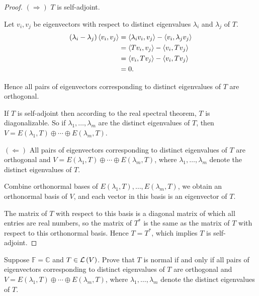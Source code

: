 \begin{proof}
    $(\Rightarrow)$ $T$ is self-adjoint.

    Let $v_{i}, v_{j}$ be eigenvectors with respect to distinct eigenvalues $\lambda_{i}$ and $\lambda_{j}$ of $T$.
    \begin{align*}
        (\lambda_{i} - \lambda_{j})\left\langle{v_{i}, v_{j}}\right\rangle & = \left\langle{\lambda_{i}v_{i}, v_{j}}\right\rangle - \left\langle{v_{i}, \lambda_{j}v_{j}}\right\rangle \\
                                                            & = \left\langle{Tv_{i}, v_{j}}\right\rangle - \left\langle{v_{i}, Tv_{j}}\right\rangle                     \\
                                                            & = \left\langle{v_{i}, Tv_{j}}\right\rangle - \left\langle{v_{i}, Tv_{j}}\right\rangle                     \\
                                                            & = 0.
    \end{align*}

    Hence all pairs of eigenvectors corresponding to distinct eigenvalues of $T$ are orthogonal.

    If $T$ is self-adjoint then according to the real spectral theorem, $T$ is diagonalizable. So if $\lambda_{1}, \ldots, \lambda_{m}$ are the distinct eigenvalues of $T$, then $V = E(\lambda_{1}, T)\oplus \cdots\oplus E(\lambda_{m}, T)$.

    \bigskip
    $(\Leftarrow)$ All pairs of eigenvectors corresponding to distinct eigenvalues of $T$ are orthogonal and $V = E(\lambda_{1}, T)\oplus \cdots\oplus E(\lambda_{m}, T)$, where $\lambda_{1}, \ldots, \lambda_{m}$ denote the distinct eigenvalues of $T$.

    Combine orthonormal bases of $E(\lambda_{1}, T), \ldots, E(\lambda_{m}, T)$, we obtain an orthonormal basis of $V$, and each vector in this basis is an eigenvector of $T$.

    The matrix of $T$ with respect to this basis is a diagonal matrix of which all entries are real numbers, so the matrix of $T^{*}$ is the same as the matrix of $T$ with respect to this orthonormal basis. Hence $T = T^{*}$, which implies $T$ is self-adjoint.
\end{proof}
\newpage

\begin{exercise}
    Suppose $\mathbb{F} = \mathbb{C}$ and $T \in \mathcal{L}\left({V}\right)$. Prove that $T$ is normal if and only if all pairs of eigenvectors corresponding to distinct eigenvalues of $T$ are orthogonal and $V = E(\lambda_{1}, T)\oplus \cdots\oplus E(\lambda_{m}, T)$, where $\lambda_{1}, \ldots, \lambda_{m}$ denote the distinct eigenvalues of $T$.
\end{exercise}

